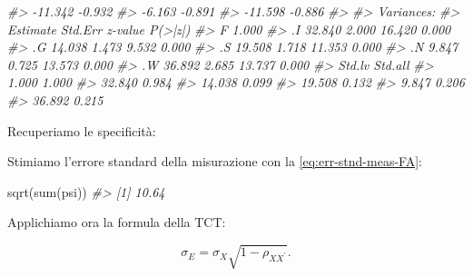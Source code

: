 \documentclass[
  11pt,
]{krantz}
\makeatletter
\newenvironment{Shaded}{\begin{snugshade}}{\end{snugshade}}
\newcommand{\CommentTok}[1]{\textcolor[rgb]{0.37,0.37,0.37}{\textit{#1}}}
\newcommand{\DecValTok}[1]{\textcolor[rgb]{0.06,0.06,0.06}{#1}}
\newcommand{\FunctionTok}[1]{\textcolor[rgb]{0,0,0}{#1}}
\newcommand{\NormalTok}[1]{#1}
\newcommand{\OtherTok}[1]{\textcolor[rgb]{0.37,0.37,0.37}{#1}}
\newcommand{\SpecialCharTok}[1]{\textcolor[rgb]{0,0,0}{#1}}
\newenvironment{kframe}{%
\medskip{}
\setlength{\fboxsep}{.8em}
 \def\at@end@of@kframe{}%
 \ifinner\ifhmode%
  \def\at@end@of@kframe{\end{minipage}}%
  \begin{minipage}{\columnwidth}%
 \fi\fi%
 \def\FrameCommand##1{\hskip\@totalleftmargin \hskip-\fboxsep
 \colorbox{shadecolor}{##1}\hskip-\fboxsep
     \hskip-\linewidth \hskip-\@totalleftmargin \hskip\columnwidth}%
 \MakeFramed {\advance\hsize-\width
   \@totalleftmargin\z@ \linewidth\hsize
   \@setminipage}}%
 {\par\unskip\endMakeFramed%
 \at@end@of@kframe}
\renewenvironment{Shaded}{\begin{kframe}}{\end{kframe}}
\theoremstyle{definition}
\theoremstyle{definition}
\theoremstyle{definition}
\theoremstyle{definition}
\theoremstyle{remark}
\makeatother
\begin{document}
\begin{Shaded}
\begin{Highlighting}[]
\CommentTok{\#\textgreater{}   {-}11.342   {-}0.932}
\CommentTok{\#\textgreater{}    {-}6.163   {-}0.891}
\CommentTok{\#\textgreater{}   {-}11.598   {-}0.886}
\CommentTok{\#\textgreater{} }
\CommentTok{\#\textgreater{} Variances:}
\CommentTok{\#\textgreater{}                    Estimate  Std.Err  z{-}value  P(\textgreater{}|z|)}
\CommentTok{\#\textgreater{}     F                 1.000                           }
\CommentTok{\#\textgreater{}    .I                32.840    2.000   16.420    0.000}
\CommentTok{\#\textgreater{}    .G                14.038    1.473    9.532    0.000}
\CommentTok{\#\textgreater{}    .S                19.508    1.718   11.353    0.000}
\CommentTok{\#\textgreater{}    .N                 9.847    0.725   13.573    0.000}
\CommentTok{\#\textgreater{}    .W                36.892    2.685   13.737    0.000}
\CommentTok{\#\textgreater{}    Std.lv  Std.all}
\CommentTok{\#\textgreater{}     1.000    1.000}
\CommentTok{\#\textgreater{}    32.840    0.984}
\CommentTok{\#\textgreater{}    14.038    0.099}
\CommentTok{\#\textgreater{}    19.508    0.132}
\CommentTok{\#\textgreater{}     9.847    0.206}
\CommentTok{\#\textgreater{}    36.892    0.215}
\end{Highlighting}
\end{Shaded}

Recuperiamo le specificità:

\begin{Shaded}
\end{Shaded}

Stimiamo l'errore standard della misurazione con la \eqref{eq:err-stnd-meas-FA}:

\begin{Shaded}
\begin{Highlighting}[]
\FunctionTok{sqrt}\NormalTok{(}\FunctionTok{sum}\NormalTok{(psi))}
\CommentTok{\#\textgreater{} [1] 10.64}
\end{Highlighting}
\end{Shaded}

Applichiamo ora la formula della TCT:

\[
\sigma_E = \sigma_X \sqrt{1 -\rho_{XX^\prime}}.
\]
\end{document}
